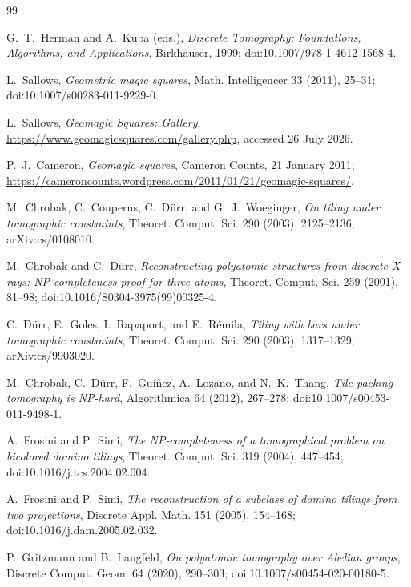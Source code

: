 \begin{thebibliography}{99}

G.~T.~Herman and A.~Kuba (eds.),
\emph{Discrete Tomography: Foundations, Algorithms, and Applications},
Birkh\"auser, 1999;
doi:10.1007/978-1-4612-1568-4.

L.~Sallows,
\emph{Geometric magic squares},
Math. Intelligencer 33 (2011), 25--31;
doi:10.1007/s00283-011-9229-0.

L.~Sallows,
\emph{Geomagic Squares: Gallery},
\url{https://www.geomagicsquares.com/gallery.php},
accessed 26 July 2026.

P.~J.~Cameron,
\emph{Geomagic squares},
Cameron Counts, 21 January 2011;
\url{https://cameroncounts.wordpress.com/2011/01/21/geomagic-squares/}.

M.~Chrobak, C.~Couperus, C.~D\"urr, and G.~J.~Woeginger,
\emph{On tiling under tomographic constraints},
Theoret. Comput. Sci. 290 (2003), 2125--2136;
arXiv:cs/0108010.

M.~Chrobak and C.~D\"urr,
\emph{Reconstructing polyatomic structures from discrete X-rays:
NP-completeness proof for three atoms},
Theoret. Comput. Sci. 259 (2001), 81--98;
doi:10.1016/S0304-3975(99)00325-4.

C.~D\"urr, E.~Goles, I.~Rapaport, and E.~R\'emila,
\emph{Tiling with bars under tomographic constraints},
Theoret. Comput. Sci. 290 (2003), 1317--1329;
arXiv:cs/9903020.

M.~Chrobak, C.~D\"urr, F.~Gu\'i\~nez, A.~Lozano, and N.~K.~Thang,
\emph{Tile-packing tomography is NP-hard},
Algorithmica 64 (2012), 267--278;
doi:10.1007/s00453-011-9498-1.

A.~Frosini and P.~Simi,
\emph{The NP-completeness of a tomographical problem on bicolored domino
tilings},
Theoret. Comput. Sci. 319 (2004), 447--454;
doi:10.1016/j.tcs.2004.02.004.

A.~Frosini and P.~Simi,
\emph{The reconstruction of a subclass of domino tilings from two
projections},
Discrete Appl. Math. 151 (2005), 154--168;
doi:10.1016/j.dam.2005.02.032.

P.~Gritzmann and B.~Langfeld,
\emph{On polyatomic tomography over Abelian groups},
Discrete Comput. Geom. 64 (2020), 290--303;
doi:10.1007/s00454-020-00180-5.


\end{thebibliography}
